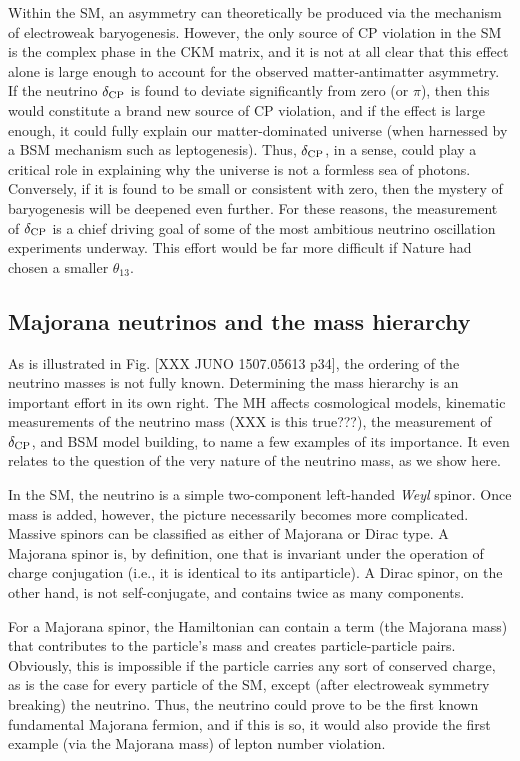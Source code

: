 \documentclass[../thesis.tex]{subfiles}
\begin{document}
Within the SM, an asymmetry can theoretically be produced via the mechanism of
electroweak baryogenesis. However, the only source of CP violation in the SM is
the complex phase in the CKM matrix, and it is not at all clear that this effect
alone is large enough to account for the observed matter-antimatter
asymmetry. If the neutrino $\delta_\text{CP}$ is found to deviate significantly from zero
(or $\pi$), then this would constitute a brand new source of CP violation, and
if the effect is large enough, it could fully explain our matter-dominated
universe (when harnessed by a BSM mechanism such as leptogenesis). Thus, $\delta_\text{CP}$,
in a sense, could play a critical role in explaining why the universe is not a
formless sea of photons. Conversely, if it is found to be small or consistent
with zero, then the mystery of baryogenesis will be deepened even further. For
these reasons, the measurement of $\delta_\text{CP}$ is a chief driving goal of some of the
most ambitious neutrino oscillation experiments underway. This effort would be
far more difficult if Nature had chosen a smaller $\theta_{13}$.

\subsection{Majorana neutrinos and the mass hierarchy}
\label{sec:majorana}

As is illustrated in Fig. [XXX JUNO 1507.05613 p34], the ordering of the
neutrino masses is not fully known. Determining the mass hierarchy is an
important effort in its own right. The MH affects cosmological models, kinematic
measurements of the neutrino mass (XXX is this true???), the measurement of
$\delta_\text{CP}$, and BSM model building, to name a few examples of its importance. It
even relates to the question of the very nature of the neutrino mass, as we show
here.

In the SM, the neutrino is a simple two-component left-handed \emph{Weyl}
spinor. Once mass is added, however, the picture necessarily becomes more
complicated. Massive spinors can be classified as either of Majorana or Dirac
type. A Majorana spinor is, by definition, one that is invariant under the
operation of charge conjugation (i.e., it is identical to its antiparticle). A
Dirac spinor, on the other hand, is not self-conjugate, and contains twice as
many components.

For a Majorana spinor, the Hamiltonian can contain a term (the Majorana mass)
that contributes to the particle's mass and creates particle-particle
pairs. Obviously, this is impossible if the particle carries any sort of
conserved charge, as is the case for every particle of the SM, except (after
electroweak symmetry breaking) the neutrino. Thus, the neutrino could prove to
be the first known fundamental Majorana fermion, and if this is so, it would
also provide the first example (via the Majorana mass) of lepton number
violation.
\end{document}
